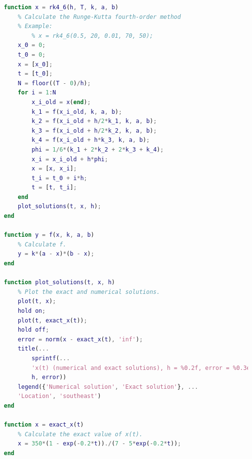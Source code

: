 \documentclass{article}
\begin{document}
        \begin{lstlisting}[language=Matlab]
function x = rk4_6(h, T, k, a, b)
    % Calculate the Runge-Kutta fourth-order method
    % Example:
        % x = rk4_6(0.5, 20, 0.01, 70, 50);
    x_0 = 0;
    t_0 = 0;
    x = [x_0];
    t = [t_0];
    N = floor((T - 0)/h);
    for i = 1:N
        x_i_old = x(end);
        k_1 = f(x_i_old, k, a, b);
        k_2 = f(x_i_old + h/2*k_1, k, a, b);
        k_3 = f(x_i_old + h/2*k_2, k, a, b);
        k_4 = f(x_i_old + h*k_3, k, a, b);
        phi = 1/6*(k_1 + 2*k_2 + 2*k_3 + k_4);
        x_i = x_i_old + h*phi;
        x = [x, x_i];
        t_i = t_0 + i*h;
        t = [t, t_i];
    end
    plot_solutions(t, x, h);
end

function y = f(x, k, a, b)
    % Calculate f.
    y = k*(a - x)*(b - x);
end

function plot_solutions(t, x, h)
    % Plot the exact and numerical solutions.
    plot(t, x);
    hold on;
    plot(t, exact_x(t));
    hold off;
    error = norm(x - exact_x(t), 'inf');
    title(...
        sprintf(...
        'x(t) (numerical and exact solutions), h = %0.2f, error = %0.3e', ...
        h, error))
    legend({'Numerical solution', 'Exact solution'}, ...
    'Location', 'southeast')
end

function x = exact_x(t)
    % Calculate the exact value of x(t).
    x = 350*(1 - exp(-0.2*t))./(7 - 5*exp(-0.2*t));
end
        \end{lstlisting}
\end{document}
